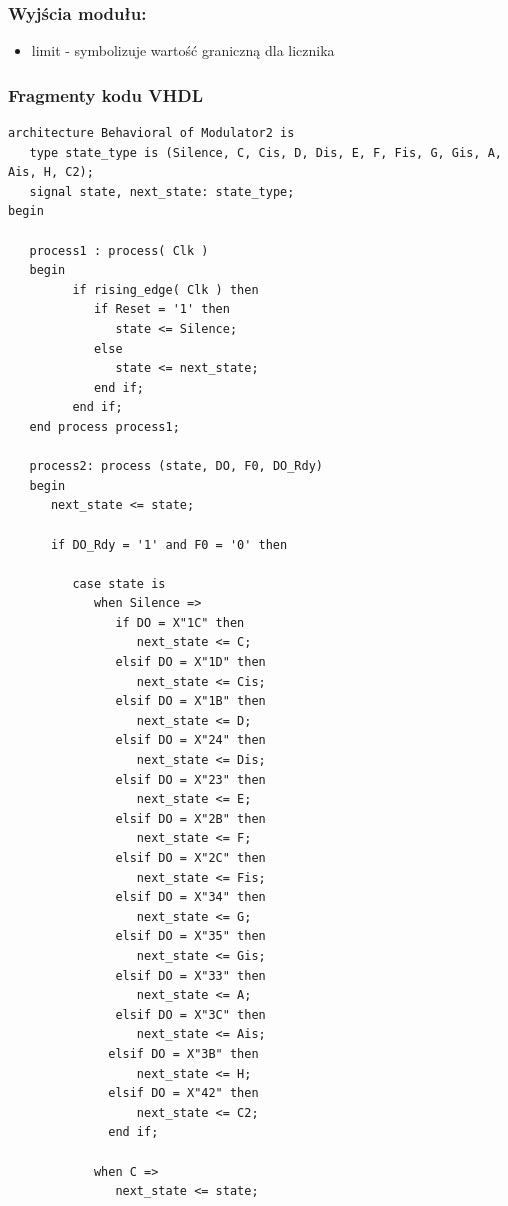 \documentclass[a4paper,11pt]{article}
\begin{document}
\subsubsection*{Wyjścia modułu:}
\begin{itemize}
\item limit - symbolizuje wartość graniczną dla licznika
\end{itemize}

\subsubsection*{Fragmenty kodu VHDL}
\begin{lstlisting}
architecture Behavioral of Modulator2 is
   type state_type is (Silence, C, Cis, D, Dis, E, F, Fis, G, Gis, A, Ais, H, C2);
   signal state, next_state: state_type;
begin

   process1 : process( Clk )
   begin
         if rising_edge( Clk ) then
            if Reset = '1' then
               state <= Silence;
            else
               state <= next_state;
            end if;
         end if;
   end process process1;
   
   process2: process (state, DO, F0, DO_Rdy)
   begin
      next_state <= state;
      
      if DO_Rdy = '1' and F0 = '0' then
      
         case state is
            when Silence =>
               if DO = X"1C" then
                  next_state <= C;
               elsif DO = X"1D" then
                  next_state <= Cis;
               elsif DO = X"1B" then
                  next_state <= D;
               elsif DO = X"24" then
                  next_state <= Dis;
               elsif DO = X"23" then
                  next_state <= E;
               elsif DO = X"2B" then
                  next_state <= F;
               elsif DO = X"2C" then
                  next_state <= Fis;
               elsif DO = X"34" then
                  next_state <= G;
               elsif DO = X"35" then
                  next_state <= Gis;
               elsif DO = X"33" then
                  next_state <= A;
               elsif DO = X"3C" then
                  next_state <= Ais;
              elsif DO = X"3B" then
                  next_state <= H;
              elsif DO = X"42" then
                  next_state <= C2;
              end if;
              
            when C =>
               next_state <= state;
               

\end{lstlisting}
\end{document}
